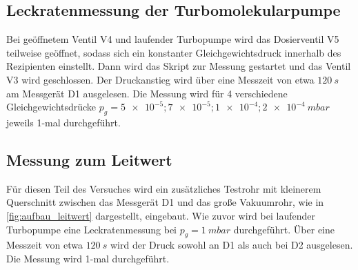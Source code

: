 \subsection{Leckratenmessung der Turbomolekularpumpe}
Bei geöffnetem Ventil V4 und laufender Turbopumpe wird das Dosierventil V5 teilweise geöffnet, sodass sich ein konstanter Gleichgewichtsdruck innerhalb des Rezipienten einstellt.
Dann wird das Skript zur Messung gestartet und das Ventil V3 wird geschlossen. Der Druckanstieg wird über eine Messzeit von etwa $\SI{120}{s}$ am Messgerät D1 ausgelesen.
Die Messung wird für 4 verschiedene Gleichgewichtsdrücke $p_{\mathit{g}} = \num{5e-5}; \num{7e-5}; \num{1e-4}; \SI{2e-4}{mbar}$ jeweils 1-mal durchgeführt.

\subsection{Messung zum Leitwert}
Für diesen Teil des Versuches wird ein zusätzliches Testrohr mit kleinerem Querschnitt zwischen das Messgerät D1 und das große Vakuumrohr, wie in \autoref{fig:aufbau_leitwert}
dargestellt, eingebaut. Wie zuvor wird bei laufender Turbopumpe eine Leckratenmessung bei $p_{\mathit{g}} = \SI{1}{mbar}$ durchgeführt. Über eine Messzeit von etwa $\SI{120}{s}$
wird der Druck sowohl an D1 als auch bei D2 ausgelesen. Die Messung wird 1-mal durchgeführt.